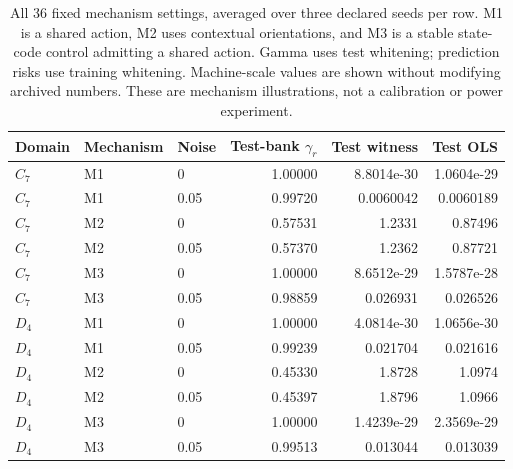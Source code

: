 \begin{table}[ht]
\caption{All 36 fixed mechanism settings, averaged over three declared seeds per row. M1 is a shared action, M2 uses contextual orientations, and M3 is a stable state-code control admitting a shared action. Gamma uses test whitening; prediction risks use training whitening. Machine-scale values are shown without modifying archived numbers. These are mechanism illustrations, not a calibration or power experiment.}
\label{tab:followup-simulations}
\centering\small
\begin{tabular}{@{}lllrrr@{}}
\toprule
Domain & Mechanism & Noise & Test-bank $\gamma_r$ & Test witness & Test OLS \\
\midrule
$C_7$ & M1 & 0 & 1.00000 & 8.8014e-30 & 1.0604e-29 \\
$C_7$ & M1 & 0.05 & 0.99720 & 0.0060042 & 0.0060189 \\
$C_7$ & M2 & 0 & 0.57531 & 1.2331 & 0.87496 \\
$C_7$ & M2 & 0.05 & 0.57370 & 1.2362 & 0.87721 \\
$C_7$ & M3 & 0 & 1.00000 & 8.6512e-29 & 1.5787e-28 \\
$C_7$ & M3 & 0.05 & 0.98859 & 0.026931 & 0.026526 \\
$D_4$ & M1 & 0 & 1.00000 & 4.0814e-30 & 1.0656e-30 \\
$D_4$ & M1 & 0.05 & 0.99239 & 0.021704 & 0.021616 \\
$D_4$ & M2 & 0 & 0.45330 & 1.8728 & 1.0974 \\
$D_4$ & M2 & 0.05 & 0.45397 & 1.8796 & 1.0966 \\
$D_4$ & M3 & 0 & 1.00000 & 1.4239e-29 & 2.3569e-29 \\
$D_4$ & M3 & 0.05 & 0.99513 & 0.013044 & 0.013039 \\
\bottomrule
\end{tabular}
\end{table}
